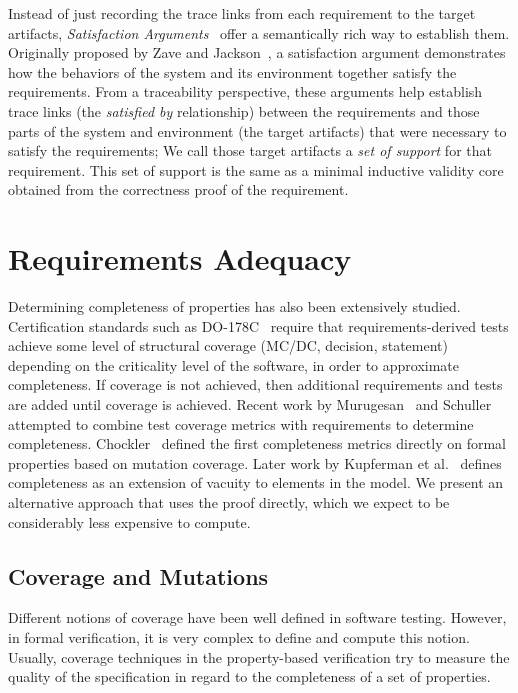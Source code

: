 Instead of just recording the trace links from each requirement to the target artifacts, \emph{Satisfaction Arguments}~\cite{zave1997four} offer a semantically rich way to establish them. Originally proposed by Zave and Jackson~\cite{zave1997four}, a satisfaction argument demonstrates how the behaviors of the system and its environment together satisfy the requirements. From a traceability perspective, these arguments help establish
 trace links (the \emph{satisfied by} relationship) between the requirements and those parts of the system and environment (the target artifacts) that were necessary to satisfy the requirements; We call those target artifacts a \emph{set of support} for that requirement. This set of support is the same as a minimal inductive validity core obtained from the correctness proof of the requirement.

\section{Requirements Adequacy}
Determining completeness of properties has also been extensively studied. Certification standards such as DO-178C~\cite{DO178C} require that requirements-derived tests achieve some level of structural coverage (MC/DC, decision, statement) depending on the criticality level of the software, in order to approximate completeness.  If coverage is not achieved, then additional requirements and tests are added until coverage is achieved. Recent work by Murugesan~\cite{murugesan2015we} and Schuller~\cite{schuler_assessing_2011} attempted to combine test coverage metrics with requirements to determine completeness.  Chockler~\cite{chockler_coverage_2003} defined the first completeness metrics directly on formal properties based on mutation coverage.  Later work by Kupferman et al.~\cite{Kupferman:2006:SCF} defines completeness as an extension of vacuity to elements in the model.  We present an alternative approach that uses the proof directly, which we expect to be considerably less expensive to compute.


\subsection{Coverage and Mutations}

Different notions of coverage have been well defined in software testing. However, in formal verification, it is very complex to define and compute this notion.
Usually, coverage techniques in the property-based verification try to measure the quality of the specification in regard to the completeness of a set of properties.

